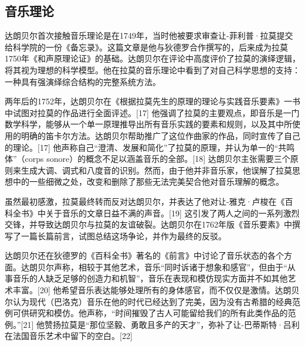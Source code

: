 \subsection{音乐理论}
达朗贝尔首次接触音乐理论是在1749年，当时他被要求审查让-菲利普·拉莫提交给科学院的一份《备忘录》。这篇文章是他与狄德罗合作撰写的，后来成为拉莫1750年《和声原理论证》的基础。达朗贝尔在评论中高度评价了拉莫的演绎逻辑，将其视为理想的科学模型。他在拉莫的音乐理论中看到了对自己科学思想的支持：一种具有强演绎综合结构的完整系统方法。

两年后的1752年，达朗贝尔在《根据拉莫先生的原理的理论与实践音乐要素》一书中试图对拉莫的作品进行全面评述。[17] 他强调了拉莫的主要观点，即音乐是一门数学科学，能够从一个单一原理推导出所有音乐实践的要素和规则，以及其中所使用的明确的笛卡尔方法。达朗贝尔帮助推广了这位作曲家的作品，同时宣传了自己的理论。[17] 他声称自己“澄清、发展和简化”了拉莫的原理，并认为单一的“共鸣体”（corps sonore）的概念不足以涵盖音乐的全部。[18] 达朗贝尔主张需要三个原则来生成大调、调式和八度音的识别。然而，由于他并非音乐家，他误解了拉莫思想中的一些细微之处，改变和删除了那些无法完美契合他对音乐理解的概念。

虽然最初感激，拉莫最终转而反对达朗贝尔，并表达了他对让-雅克·卢梭在《百科全书》中关于音乐的文章日益不满的声音。[19] 这引发了两人之间的一系列激烈交锋，并导致达朗贝尔与拉莫的友谊破裂。达朗贝尔在1762年版《音乐要素》中撰写了一篇长篇前言，试图总结这场争论，并作为最终的反驳。

达朗贝尔还在狄德罗的《百科全书》著名的《前言》中讨论了音乐状态的各个方面。达朗贝尔声称，相较于其他艺术，音乐“同时诉诸于想象和感官”，但由于“从事音乐的人缺乏足够的创造力和机智”，音乐在表现和模仿现实方面并不如其他艺术丰富。[20] 他希望音乐表达能够处理所有的身体感官，而不仅仅是激情。达朗贝尔认为现代（巴洛克）音乐在他的时代已经达到了完美，因为没有古希腊的经典范例可供研究和模仿。他声称，“时间摧毁了古人可能留给我们的所有此类作品的范例。”[21] 他赞扬拉莫是“那位坚毅、勇敢且多产的天才”，弥补了让-巴蒂斯特·吕利在法国音乐艺术中留下的空白。[22]